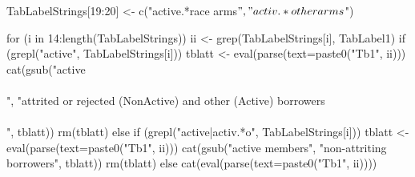 \begin{Schunk}
\begin{Sinput}
TabLabelStrings[19:20] <- c("active.*race arms$", "activ.*other arms$")
\end{Sinput}
\end{Schunk}
\begin{Sinput}
for (i in 14:length(TabLabelStrings)) {
  ii <- grep(TabLabelStrings[i], TabLabel1)
  if (grepl("active", TabLabelStrings[i])){
   tblatt <- eval(parse(text=paste0("Tb1", ii)))
   cat(gsub("active\\\\", "attrited or rejected (NonActive) and other (Active) borrowers\\\\", 
     tblatt)) 
   rm(tblatt)
  } else
  if (grepl("active|activ.*o", TabLabelStrings[i])) {
   tblatt <- eval(parse(text=paste0("Tb1", ii)))
   cat(gsub("active members", "non-attriting borrowers", 
     tblatt)) 
    rm(tblatt)
  } else
   cat(eval(parse(text=paste0("Tb1", ii))))
}
\end{Sinput}
